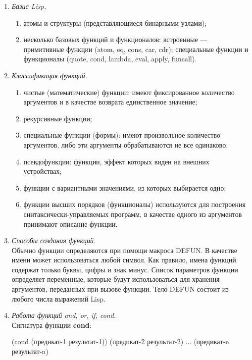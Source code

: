 \documentclass[12pt]{report}
\begin{document}
\begin{enumerate}[wide=0pt]
\item \textit{Базис Lisp.} \\
\begin{enumerate}
	\item атомы и структуры (представляющиеся бинарными узлами);
	\item несколько базовых функций и функционалов: встроенные --- примитивные функции (atom, eq, cons, car, cdr); специальные функции и функционалы (quote, cond, lambda, eval, apply, funcall).
\end{enumerate}
\item \textit{Классификация функций.} \\
\begin{enumerate}
	\item чистые (математические) функции: имеют фиксированное количество
	аргументов и в качестве возврата единственное значение;
	\item рекурсивные функции;
	\item специальные функции (формы): имеют произвольное количество
	аргументов, либо эти аргументы обрабатываются не все одинаково;
	\item псевдофункции: функции, эффект которых виден на внешних
	устройствах;
	\item функции с вариантными значениями, из которых выбирается одно;
	\item функции высших порядков (функционалы) используются для
	построения синтаксически-управляемых программ, в качестве одного
	из аргументов принимают описание функции.
\end{enumerate}
\item \textit{Способы создания функций.} \\
Обычно функции определяются при помощи макроса DEFUN. В качестве имени может использоваться любой символ. Как правило, имена функций содержат только буквы, цифры и знак минус. Список параметров функции определяет переменные, которые будут использоваться для хранения аргументов, переданных при вызове функции. Тело DEFUN состоит из любого числа выражений Lisp. 
\item \textit{Работа функций and, or, if, cond.} \\
Сигнатура функции \textbf{cond}:

\indent(cond (предикат-1 результат-1)) \newline
\indent(предикат-2 результат-2) \newline
\indent...\newline
\indent(предикат-n результат-n)\newline


\end{enumerate}
\end{document}
